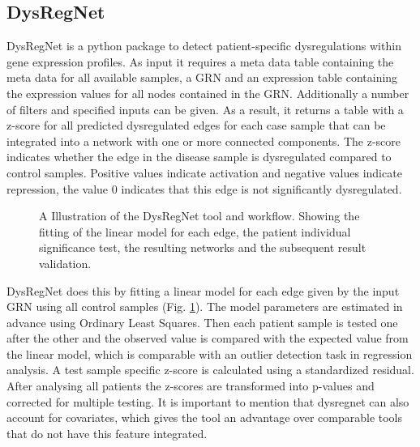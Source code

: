 \documentclass[pdftex,12pt,a4paper]{report}
\begin{document}
\subsection{DysRegNet}

DysRegNet\cite{dysregnet} is a python package to detect patient-specific dysregulations within gene expression profiles. 
As input it requires a meta data table containing the meta data for all available samples, a GRN and an expression table containing the expression values for all nodes contained in the GRN. Additionally a number of filters and specified inputs can be given. 
As a result, it returns a table with a z-score for all predicted dysregulated edges for each case sample that can be integrated into a network with one or more connected components. The z-score indicates whether the edge in the disease sample is dysregulated compared to control samples. Positive values indicate activation and negative values indicate repression, the value 0 indicates that this edge is not significantly dysregulated. 
\begin{figure}[!ht]
\begin{center}
	\caption{A Illustration of the DysRegNet tool and workflow. Showing the fitting of the linear model for each edge, the patient individual significance test, the resulting networks and the subsequent result validation\cite{dysregnet}.}
	\label{dysregnet}
\end{center}
\end{figure}

DysRegNet does this by fitting a linear model for each edge given by the input GRN using all control samples (Fig. \ref{dysregnet}). The model parameters are estimated in advance using Ordinary Least Squares. Then each patient sample is tested one after the other and the observed value is compared with the expected value from the linear model, which is comparable with an outlier detection task in regression analysis. A test sample specific z-score is calculated using a standardized residual. After analysing all patients the z-scores are transformed into p-values and corrected for multiple testing. It is important to mention that dysregnet can also account for covariates, which gives the tool an advantage over comparable tools that do not have this feature integrated.
\end{document}
